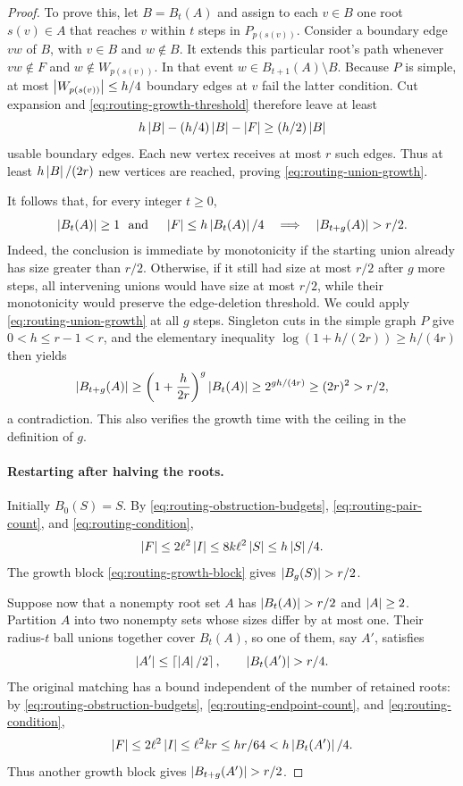 \begin{proof}
To prove this, let $B=B_t(A)$ and assign to each $v\in B$ one root
$s(v)\in A$ that reaches $v$ within $t$ steps in $P_{p(s(v))}$.
Consider a boundary edge $vw$ of $B$, with $v\in B$ and $w\notin B$.
It extends this particular root's path whenever $vw\notin F$ and
$w\notin W_{p(s(v))}$.  In that event $w\in B_{t+1}(A)\setminus B$.
Because $P$ is simple, at most $\left|W_{p(s(v))}\right|\le h/4$ boundary
edges at $v$ fail the latter condition.  Cut expansion and
\eqref{eq:routing-growth-threshold} therefore leave at least
\[
  h\left|B\right|-(h/4)\left|B\right|-\left|F\right|\ge(h/2)\left|B\right|
\]
usable boundary edges.  Each new vertex receives at most $r$ such
edges.  Thus at least $h\left|B\right|/(2r)$ new vertices are reached, proving
\eqref{eq:routing-union-growth}.

It follows that, for every integer $t\ge 0$,
\begin{equation}\label{eq:routing-growth-block}
  \abs{B_t(A)}\ge 1\ \text{ and }\quad
  \abs F\le h\abs{B_t(A)}/4
  \quad\Longrightarrow\quad
  \abs{B_{t+g}(A)}>r/2.
\end{equation}
Indeed, the conclusion is immediate by monotonicity if the starting
union already has size greater than $r/2$.  Otherwise, if it still had
size at most $r/2$ after $g$ more steps, all intervening unions would
have size at most $r/2$, while their monotonicity would preserve the
edge-deletion threshold.  We could apply
\eqref{eq:routing-union-growth} at all $g$ steps.  Singleton cuts in
the simple graph $P$ give $0<h\le r-1<r$, and the elementary inequality
$\log(1+h/(2r))\ge h/(4r)$ then yields
\[
  \left|B_{t+g}(A)\right|
  \ge \left(1+\frac{h}{2r}\right)^g\left|B_t(A)\right|
  \ge 2^{gh/(4r)}
  \ge (2r)^2>r/2,
\]
a contradiction.  This also verifies the growth time with the ceiling
in the definition of $g$.

\paragraph{Restarting after halving the roots.}
Initially $B_0(S)=S$.  By \eqref{eq:routing-obstruction-budgets},
\eqref{eq:routing-pair-count}, and \eqref{eq:routing-condition},
\[
  \left|F\right|\le 2\ell^2\left|I\right|
  \le 8k\ell^2\left|S\right|\le h\left|S\right|/4.
\]
The growth block \eqref{eq:routing-growth-block} gives
$\abs{B_g(S)}>r/2$.

Suppose now that a nonempty root set $A$ has
$\abs{B_t(A)}>r/2$ and $\left|A\right|\ge 2$.  Partition $A$ into two
nonempty sets whose sizes differ by at most one.  Their radius-$t$
ball unions together cover $B_t(A)$, so one of them, say $A'$, satisfies
\[
  \abs{A'}\le\ceil{\abs A/2},\qquad
  \abs{B_t(A')}>r/4.
\]
The original matching has a bound independent of the number of retained
roots: by \eqref{eq:routing-obstruction-budgets},
\eqref{eq:routing-endpoint-count}, and \eqref{eq:routing-condition},
\begin{equation}\label{eq:routing-restart-budget}
  \left|F\right|\le 2\ell^2\left|I\right|
  \le \ell^2kr\le hr/64
  < h\left|B_t(A')\right|/4.
\end{equation}
Thus another growth block gives $\abs{B_{t+g}(A')}>r/2$.


\end{proof}
